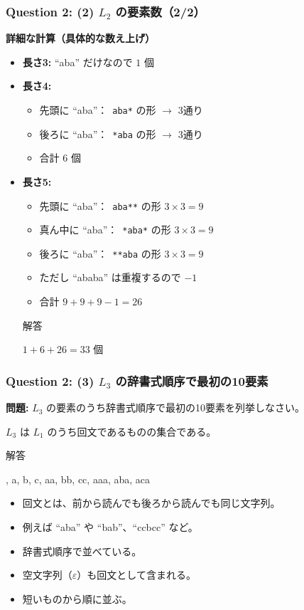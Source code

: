 \begin{frame}
  \frametitle{Question 2: (2) $L_2$ の要素数（2/2）}
  \textbf{詳細な計算（具体的な数え上げ）}

  \begin{itemize}
    \item \textbf{長さ3:} ``aba'' だけなので $1$ 個
    \item \textbf{長さ4:}  
      \begin{itemize}
        \item 先頭に ``aba''：\ \texttt{aba*} の形 $\to$ 3通り
        \item 後ろに ``aba''：\ \texttt{*aba} の形 $\to$ 3通り
        \item 合計 $6$ 個
      \end{itemize}
    \item \textbf{長さ5:}
      \begin{itemize}
        \item 先頭に ``aba''：\ \texttt{aba**} の形 $3 \times 3 = 9$
        \item 真ん中に ``aba''：\ \texttt{*aba*} の形 $3 \times 3 = 9$
        \item 後ろに ``aba''：\ \texttt{**aba} の形 $3 \times 3 = 9$
        \item ただし ``ababa'' は重複するので $-1$
        \item 合計 $9 + 9 + 9 - 1 = 26$
      \end{itemize}
    \begin{alertblock}{解答}
      \begin{center}
        $1 + 6 + 26 = 33$ 個
      \end{center}
    \end{alertblock}
  \end{itemize}
  \vspace{1em}
\end{frame}

\begin{frame}
  \frametitle{Question 2: (3) $L_3$ の辞書式順序で最初の10要素}
  \textbf{問題:} $L_3$ の要素のうち辞書式順序で最初の10要素を列挙しなさい。
  
  $L_3$ は $L_1$ のうち回文であるものの集合である。

  \begin{alertblock}{解答}
      \begin{center}
        \varepsilon, a, b, c, aa, bb, cc, aaa, aba, aca
      \end{center}
  \end{alertblock}

  \begin{itemize}
    \item 回文とは、前から読んでも後ろから読んでも同じ文字列。
    \item 例えば ``aba'' や ``bab''、``ccbcc'' など。
    \item 辞書式順序で並べている。
    \item 空文字列（$\varepsilon$）も回文として含まれる。
    \item 短いものから順に並ぶ。
  \end{itemize}
\end{frame}

